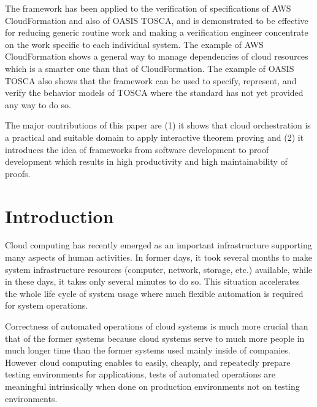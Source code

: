 \documentclass[12pt]{report}
\begin{document}
The framework has been applied to the verification of specifications
of AWS CloudFormation and also of OASIS TOSCA, and is demonstrated to
be effective for reducing generic routine work and making a
verification engineer concentrate on the work specific to each
individual system. The example of AWS CloudFormation shows a general
way to manage dependencies of cloud resources which is a smarter one
than that of CloudFormation. The example of OASIS TOSCA also shows
that the framework can be used to specify, represent, and verify the
behavior models of TOSCA where the standard has not yet provided any
way to do so.

The major contributions of this paper are (1) it shows that cloud
orchestration is a practical and suitable domain to apply interactive
theorem proving and (2) it introduces the idea of frameworks from
software development to proof development which results in high
productivity and high maintainability of proofs.


\tableofcontents
\listoffigures
\newpage
{}
\setcounter{page}{1}

\chapter{Introduction}
Cloud computing has recently emerged as an important infrastructure
supporting many aspects of human activities. In former days, it took
several months to make system infrastructure resources (computer,
network, storage, etc.) available, while in these days, it takes only
several minutes to do so. This situation accelerates the whole life
cycle of system usage where much flexible automation is required for
system operations.

Correctness of automated operations of cloud systems is much more
crucial than that of the former systems because cloud systems serve to
much more people in much longer time than the former systems used
mainly inside of companies. However cloud computing enables to easily,
cheaply, and repeatedly prepare testing environments for applications,
tests of automated operations are meaningful intrinsically when
done on production environments not on testing environments.
\end{document}
